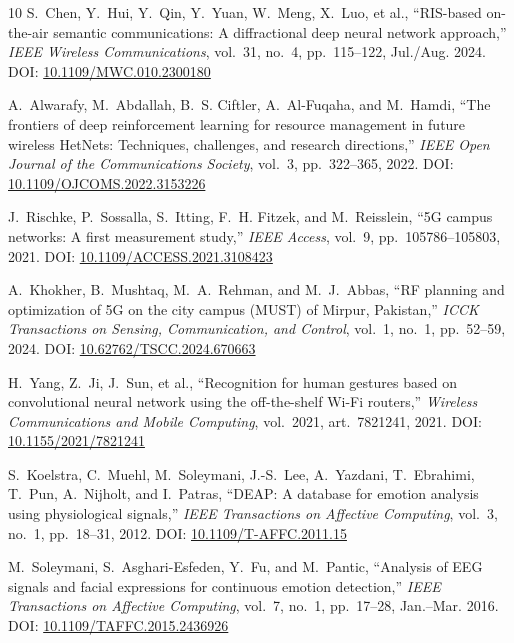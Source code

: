 \documentclass{BVP_CINC}
\begin{document}
\begin{thebibliography}{10}
S.~Chen, Y.~Hui, Y.~Qin, Y.~Yuan, W.~Meng, X.~Luo, et al., ``RIS-based on-the-air semantic communications: A diffractional deep neural network approach,'' \emph{IEEE Wireless Communications}, vol.~31, no.~4, pp.~115--122, Jul./Aug. 2024. DOI: \href{https://doi.org/10.1109/MWC.010.2300180}{10.1109/MWC.010.2300180}

A.~Alwarafy, M.~Abdallah, B.~S. Ciftler, A.~Al-Fuqaha, and M.~Hamdi, ``The frontiers of deep reinforcement learning for resource management in future wireless HetNets: Techniques, challenges, and research directions,'' \emph{IEEE Open Journal of the Communications Society}, vol.~3, pp.~322--365, 2022. DOI: \href{https://doi.org/10.1109/OJCOMS.2022.3153226}{10.1109/OJCOMS.2022.3153226}

J.~Rischke, P.~Sossalla, S.~Itting, F.~H. Fitzek, and M.~Reisslein, ``5G campus networks: A first measurement study,'' \emph{IEEE Access}, vol.~9, pp.~105786--105803, 2021. DOI: \href{https://doi.org/10.1109/ACCESS.2021.3108423}{10.1109/ACCESS.2021.3108423}

A.~Khokher, B.~Mushtaq, M.~A.~Rehman, and M.~J.~Abbas, ``RF planning and optimization of 5G on the city campus (MUST) of Mirpur, Pakistan,'' \emph{ICCK Transactions on Sensing, Communication, and Control}, vol.~1, no.~1, pp.~52--59, 2024. DOI: \href{https://doi.org/10.62762/TSCC.2024.670663}{10.62762/TSCC.2024.670663}

H.~Yang, Z.~Ji, J.~Sun, et al., ``Recognition for human gestures based on convolutional neural network using the off-the-shelf Wi-Fi routers,'' \emph{Wireless Communications and Mobile Computing}, vol.~2021, art.~7821241, 2021. DOI: \href{https://doi.org/10.1155/2021/7821241}{10.1155/2021/7821241}

S.~Koelstra, C.~Muehl, M.~Soleymani, J.-S.~Lee, A.~Yazdani, T.~Ebrahimi, T.~Pun, A.~Nijholt, and I.~Patras, ``DEAP: A database for emotion analysis using physiological signals,'' \emph{IEEE Transactions on Affective Computing}, vol.~3, no.~1, pp.~18--31, 2012. DOI: \href{https://doi.org/10.1109/T-AFFC.2011.15}{10.1109/T-AFFC.2011.15}

M.~Soleymani, S.~Asghari-Esfeden, Y.~Fu, and M.~Pantic, ``Analysis of EEG signals and facial expressions for continuous emotion detection,'' \emph{IEEE Transactions on Affective Computing}, vol.~7, no.~1, pp.~17--28, Jan.--Mar. 2016. DOI: \href{https://doi.org/10.1109/TAFFC.2015.2436926}{10.1109/TAFFC.2015.2436926}


\end{thebibliography}
\end{document}
